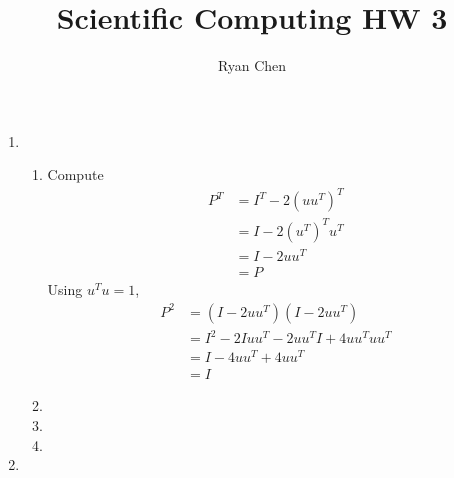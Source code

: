 \documentclass{article}
\title{Scientific Computing HW 3}
\author{Ryan Chen}
\begin{document}
	
\maketitle



\begin{enumerate}
	
	
	
	\item 
	
	\begin{enumerate}
		
		
		
		\item Compute
		\begin{align*}
			P^T &= I^T - 2(uu^T)^T \\
			&= I - 2(u^T)^Tu^T \\
			&= I - 2uu^T \\
			&= P
		\end{align*}
		Using $u^Tu=1$,
		\begin{align*}
			P^2 &= (I - 2uu^T)(I - 2uu^T) \\
			&= I^2 - 2Iuu^T - 2uu^TI + 4uu^Tuu^T \\
			&= I - 4uu^T + 4uu^T \\
			&= I
		\end{align*}
		
		
		
		\item
		
		
		
		\item
		
		
		
		\item
		
		
		 
	\end{enumerate}

	
	
	\pagebreak
	
	

	\item
	
	\begin{enumerate}
		
		
		

\end{enumerate}
\end{enumerate}
\end{document}
